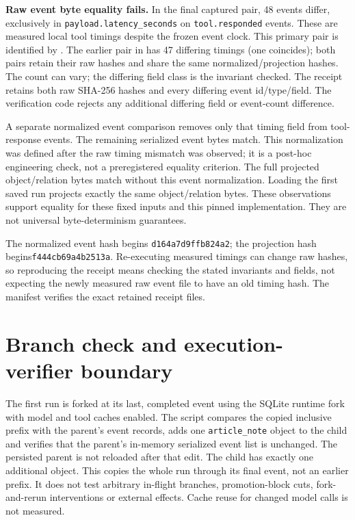 \documentclass[11pt]{article}
\begin{document}
\textbf{Raw event byte equality fails.} In the final captured pair, 48 events differ, exclusively in \texttt{payload.latency\_seconds} on \texttt{tool.responded} events. These are measured local tool timings despite the frozen event clock. This primary pair is identified by . The earlier pair in  has 47 differing timings (one coincides); both pairs retain their raw hashes and share the same normalized/projection hashes. The count can vary; the differing field class is the invariant checked. The receipt retains both raw SHA-256 hashes and every differing event id/type/field. The verification code rejects any additional differing field or event-count difference.

A separate normalized event comparison removes only that timing field from tool-response events. The remaining serialized event bytes match. This normalization was defined after the raw timing mismatch was observed; it is a post-hoc engineering check, not a preregistered equality criterion. The full projected object/relation bytes match without this event normalization. Loading the first saved run projects exactly the same object/relation bytes. These observations support equality for these fixed inputs and this pinned implementation. They are not universal byte-determinism guarantees.

The normalized event hash begins \texttt{d164a7d9ffb824a2}; the projection hash begins\linebreak\texttt{f444cb69a4b2513a}. Re-executing measured timings can change raw hashes, so reproducing the receipt means checking the stated invariants and fields, not expecting the newly measured raw event file to have an old timing hash. The manifest verifies the exact retained receipt files.

\section*{Branch check and execution-verifier boundary}
The first run is forked at its last, completed event using the SQLite runtime fork with model and tool caches enabled. The script compares the copied inclusive prefix with the parent's event records, adds one \texttt{article\_note} object to the child and verifies that the parent's in-memory serialized event list is unchanged. The persisted parent is not reloaded after that edit. The child has exactly one additional object. This copies the whole run through its final event, not an earlier prefix. It does not test arbitrary in-flight branches, promotion-block cuts, fork-and-rerun interventions or external effects. Cache reuse for changed model calls is not measured.
\end{document}
